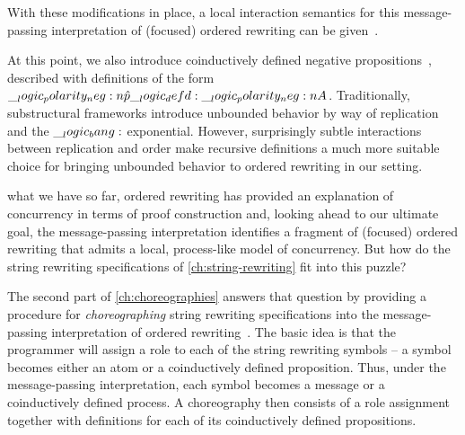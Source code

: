 
With these modifications in place, a local interaction semantics for this message-passing interpretation of (focused) ordered rewriting can be given~.

At this point, we also introduce coinductively defined negative propositions~, described with definitions of the form $\__logic_polarity_neg:n {\hat{p}} \__logic_defd: \__logic_polarity_neg:n {A}$.
Traditionally, sub\-struc\-tural frameworks introduce unbounded behavior by way of replication and the $\__logic_bang:$ exponential.
However, surprisingly subtle interactions between replication and order make recursive definitions a much more suitable choice for bringing unbounded behavior to ordered rewriting in our setting.




 what we have so far, ordered rewriting has provided an explanation of concurrency in terms of proof construction and, looking ahead to our ultimate goal, the message-passing interpretation identifies a fragment of (focused) ordered rewriting that admits a local, process-like model of concurrency.
But how do the string rewriting specifications of \cref{ch:string-rewriting} fit into this puzzle?

The second part of \cref{ch:choreographies} answers that question by providing a procedure for \emph{choreographing} string rewriting specifications into the message-passing interpretation of ordered rewriting~.
The basic idea is that the programmer will assign a role to each of the string rewriting symbols -- a symbol becomes either an atom or a coinductively defined proposition.
Thus, under the message-passing interpretation, each symbol becomes a message or a coinductively defined process.
A choreography then consists of a role assignment together with definitions for each of its coinductively defined propositions.

